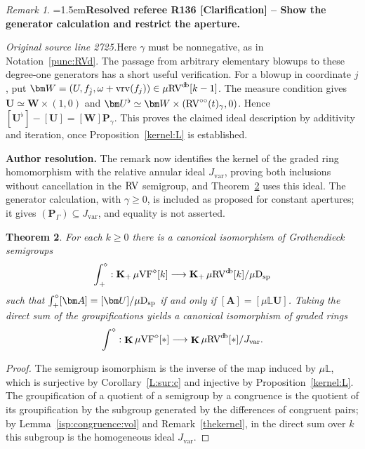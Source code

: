 \documentclass[12pt]{amsart}
\newcommand{\ResolvedRefereeRemark}[5]{%
  \par\medskip\begingroup\normalfont\small\color{gray}%
  \emergencystretch=1.5em\noindent\textbf{Resolved referee R#1 [#2] -- #3.}\par\nobreak\noindent #4\par
  \medskip\color{ResolutionGreen}\noindent\textbf{Author resolution.} #5\par
  \endgroup\medskip
}
\theoremstyle{plain}
\newtheorem{thm}{Theorem}[section]
\theoremstyle{definition}
\theoremstyle{remark}
\newtheorem{rem}[thm]{Remark}
\numberwithin{equation}{section}
\theoremstyle{plain}
\newcommand{\VF}{\textup{VF}}
\newcommand{\RV}{\textup{RV}}
\newcommand{\0}{\emptyset}
\newcommand{\bb}[1]{\mathbb{#1}}
\newcommand{\fun}{\longrightarrow}
\newcommand{\sub}{\subseteq}
\newcommand{\mVF}{{\mu}{\VF}}
\newcommand{\mRV}{{\mu}{\RV}}
\newcommand{\dsp}{\textup{D}_{\textup{sp}}}
\newcommand{\mispdb}{\mu \dsp}
\newcommand{\mL}{{\mu}{\bb L}}
\DeclareMathOperator{\gsk}{\mathbf{K}_+}
\DeclareMathOperator{\ggk}{\mathbf{K}}
\DeclareMathOperator{\vrv}{vrv}
\DeclareMathOperator{\db}{d \! b}
\newcommand{\ccirc}{\circ \circ}
\begin{document}
\begin{rem}
\ResolvedRefereeRemark{136}{Clarification}{Show the generator calculation and restrict the aperture}{%
\textit{Original source line 2725.}\quad Here $\gamma$ must be nonnegative, as in Notation~\ref{punc:RVd}. The passage from arbitrary elementary blowups to these degree-one generators has a short useful verification. For a blowup in coordinate $j$, put $\bm W=(U,f_{\tilde j},\omega+\vrv(f_j))\in\mRV^{\db}[k-1]$. The measure condition gives $\bm U\simeq\bm W\times(1,0)$ and $\bm U^\flat\simeq\bm W\times(\RV^{\ccirc}(t)_\gamma,0)$. Hence $[\bm U^\flat]-[\bm U]=[\bm W]\bm P_\gamma$. This proves the claimed ideal description by additivity and iteration, once Proposition~\ref{kernel:L} is established.
}{The remark now identifies the kernel of the graded ring homomorphism with the relative annular ideal $J_{\mathrm{var}}$, proving both inclusions without cancellation in the $\RV$ semigroup, and Theorem~\ref{main:prop} uses this ideal. The generator calculation, with $\gamma\geq0$, is included as proposed for constant apertures; it gives $(\bm P_\Gamma)\sub J_{\mathrm{var}}$, and equality is not asserted.}
\end{rem}

\begin{thm}\label{main:prop}
For each $k \geq 0$ there is a canonical isomorphism of Grothendieck semigroups
\[
  \int^{\diamond}_+ : \gsk \mVF^\diamond[k] \fun \gsk  \mRV^{\db}[k] /  \mispdb
\]
such that $\int_{+}^{\diamond} [\bm A] = [\bm U]/  \mispdb$ if and only if $[\bm A] = [{\mL}\bm U]$. Taking the direct sum of the groupifications
yields a canonical isomorphism of graded rings
\[
  \int^{\diamond} : \ggk \mVF^\diamond[*] \fun \ggk \mRV^{\db}[*] / J_{\mathrm{var}}.
\]
\end{thm}
\begin{proof}
The semigroup isomorphism is the inverse of the map induced by $\mL$, which is surjective by Corollary~\ref{L:sur:c} and injective by Proposition~\ref{kernel:L}. The groupification of a quotient of a semigroup by a congruence is the quotient of its groupification by the subgroup generated by the differences of congruent pairs; by Lemma~\ref{isp:congruence:vol} and Remark~\ref{thekernel}, in the direct sum over $k$ this subgroup is the homogeneous ideal $J_{\mathrm{var}}$.
\end{proof}
\end{document}
